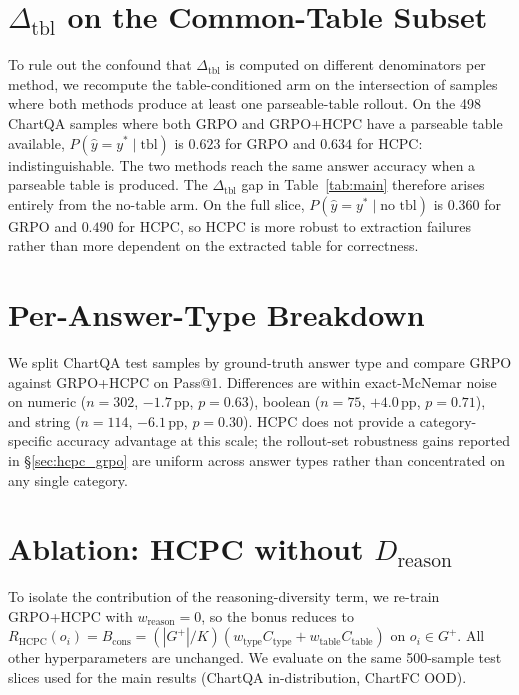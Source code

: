 \documentclass[11pt]{article}
\begin{document}
\section{$\Delta_{\text{tbl}}$ on the Common-Table Subset}
\label{sec:delta_intersection}

To rule out the confound that $\Delta_{\text{tbl}}$ is computed on
different denominators per method, we recompute the
table-conditioned arm on the intersection of samples where both
methods produce at least one parseable-table rollout. On the 498
ChartQA samples where both \textsc{GRPO} and \textsc{GRPO+HCPC}
have a parseable table available, $P(\hat y=y^*\mid\text{tbl})$ is
$0.623$ for GRPO and $0.634$ for HCPC: indistinguishable.
The two methods reach the same answer accuracy when a parseable
table is produced. The $\Delta_{\text{tbl}}$ gap in
Table~\ref{tab:main} therefore arises entirely from the no-table
arm. On the full slice, $P(\hat y=y^*\mid\text{no tbl})$ is
$0.360$ for GRPO and $0.490$ for HCPC, so HCPC is more robust to
extraction failures rather than more dependent on the extracted
table for correctness.

\section{Per-Answer-Type Breakdown}
\label{sec:answer_type}

We split ChartQA test samples by ground-truth answer type and compare
\textsc{GRPO} against \textsc{GRPO+HCPC} on Pass@1. Differences are
within exact-McNemar noise on numeric ($n{=}302$, $-1.7$\,pp,
$p{=}0.63$), boolean ($n{=}75$, $+4.0$\,pp, $p{=}0.71$), and string
($n{=}114$, $-6.1$\,pp, $p{=}0.30$). HCPC does not provide a
category-specific accuracy advantage at this scale; the rollout-set
robustness gains reported in \S\ref{sec:hcpc_grpo} are uniform
across answer types rather than concentrated on any single category.

\section{Ablation: HCPC without $D_{\text{reason}}$}
\label{sec:ablation_dreason}

To isolate the contribution of the reasoning-diversity term, we
re-train GRPO+HCPC with $w_{\text{reason}}{=}0$, so the bonus
reduces to $R_{\text{HCPC}}(o_i) = B_{\text{cons}} =
(|G^+|/K)(w_{\text{type}}C_{\text{type}} + w_{\text{table}}C_{\text{table}})$
on $o_i \in G^+$. All other hyperparameters are unchanged. We
evaluate on the same 500-sample test slices used for the main
results (ChartQA in-distribution, ChartFC OOD).
\end{document}
